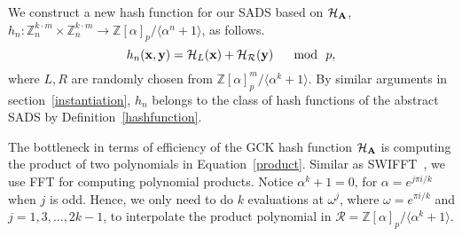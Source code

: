 We construct a new hash function for our SADS based on ${\cal H}_{\bf A}$, $h_{n}: \mathbb{Z}_{n}^{k\cdot m} \times \mathbb{Z}_{n}^{k \cdot m} \rightarrow \mathbb{Z}[\alpha]_{p}/\langle \alpha^{n}+1 \rangle$, as follows.
\begin{equation} 
h_{n}{\bf (x,y)} = {\cal H}_{L}{\bf (x)} + {\cal H}_{\mathcal{R}}{\bf (y)} \quad \mod\,\,p, 
\end{equation}
where $L, R$ are randomly chosen from $\mathbb{Z}[\alpha]_{p}^{m}/\langle \alpha^{k}+1 \rangle$. By similar arguments in section~\ref{instantiation}, $h_{n}$ belongs to the class of hash functions of the abstract SADS by Definition~\ref{hashfunction}. 

The bottleneck in terms of efficiency of the GCK hash function ${\cal H}_{\bf A}$ is computing the product of two polynomials in Equation~\ref{product}. Similar as SWIFFT~\cite{swifft}, we use FFT for computing polynomial products. Notice $\alpha^{k}+1=0$, for $\alpha=e^{j \pi i / k}$ when $j$ is odd. Hence, we only need to do $k$ evaluations at $\omega^{j}$, where $\omega= e^{\pi i / k}$ and $j=1,3,\ldots,2k-1$, to interpolate the product polynomial in $\mathcal{R}= \mathbb{Z}[\alpha]_{p}/\langle \alpha^{k}+1 \rangle$.

